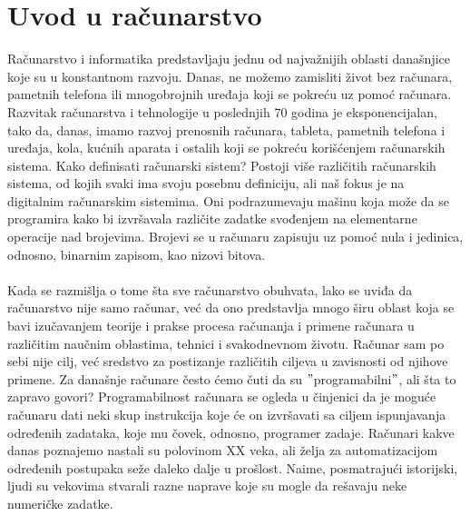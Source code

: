 \documentclass[a4paper]{article}
\begin{document}
\section{Uvod u računarstvo}
\label{sec:uvod}
Računarstvo i informatika predstavljaju jednu od najvažnijih oblasti današnjice koje su u konstantnom razvoju. Danas, ne možemo zamisliti život bez računara, pametnih telefona ili mnogobrojnih uređaja koji se pokreću uz pomoć računara. Razvitak računarstva i tehnologije u poslednjih 70 godina je eksponencijalan, tako da, danas, imamo razvoj prenosnih računara, tableta, pametnih telefona i uređaja, kola, kućnih aparata i ostalih koji se pokreću korišćenjem računarskih sistema. Kako definisati računarski sistem? Postoji više različitih računarskih sistema, od kojih svaki ima svoju posebnu definiciju, ali naš fokus je na digitalnim računarskim sistemima. Oni podrazumevaju mašinu koja može da se programira kako bi izvršavala različite zadatke svođenjem na elementarne operacije nad brojevima. Brojevi se u računaru zapisuju uz pomoć nula i jedinica, odnosno, binarnim zapisom, kao nizovi bitova. \\\\
Kada se razmišlja o tome šta sve računarstvo obuhvata, lako se uviđa da računarstvo nije samo računar, već da ono predstavlja mnogo širu oblast koja se bavi izučavanjem teorije i prakse procesa računanja i primene računara u različitim naučnim oblastima, tehnici i svakodnevnom životu. Računar sam po sebi nije cilj, već sredstvo za postizanje različitih ciljeva u zavisnosti od njihove primene. Za današnje računare često ćemo čuti da su $"$programabilni$"$, ali šta to zapravo govori? Programabilnost računara se ogleda u činjenici da je moguće računaru dati neki skup instrukcija koje će on izvršavati sa ciljem ispunjavanja određenih zadataka, koje mu čovek, odnosno, programer zadaje. Računari kakve danas poznajemo nastali su polovinom XX veka, ali želja za automatizacijom određenih postupaka seže daleko dalje u prošlost. Naime, posmatrajući istorijski, ljudi su vekovima stvarali razne naprave koje su mogle da rešavaju neke numeričke zadatke. 
\end{document}
